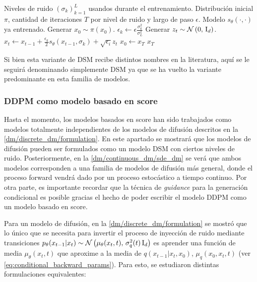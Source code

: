 \begin{algorithm}
    \caption{Annealed Langevin sampling}
    \label{alg:annealed_langevin}
    \begin{algorithmic}[1]
        \Require Niveles de ruido $(\sigma_k)_{k=1}^L$ usandos durante el entrenamiento.
        \Require Distribución inicial $\pi$, cantidad de iteraciones $T$ por nivel de ruido y largo de paso $\epsilon$.
        \Require Modelo $s_\theta(\cdot,\cdot)$ ya entrenado.
        \State Generar $x_0\sim \pi(x_0)$.
        \State $\epsilon_k \gets \epsilon \frac{\sigma_k^2}{\sigma_L^2}$  
        \State Generar $z_t\sim \mathcal{N}\left(0,\,\operatorname{I}_{d}\right)$.
        \State $x_t\gets x_{t-1} + \frac{\epsilon_k}{2}s_\theta(x_{t-1},\sigma_k) + \sqrt{\epsilon_i} z_t$
        \EndFor
        \State $x_0\gets x_T$
        \EndFor
        \State\Return $x_T$
    \end{algorithmic}
\end{algorithm}

Si bien esta variante de DSM recibe distintos nombres en la literatura, aquí se le seguirá denominando simplemente DSM ya que se ha vuelto la variante predominante en esta familia de modelos.

\subsubsection{DDPM como modelo basado en score}

Hasta el momento, los modelos basados en score han sido trabajados como modelos totalmente independientes de los modelos de difusión descritos en la \autoref{dm/discrete_dm/formulation}. En este apartado se mostrará que los modelos de difusión pueden ser formulados como un modelo DSM con ciertos niveles de ruido. Posteriormente, en la \autoref{dm/continuous_dm/sde_dm} se verá que ambos modelos corresponden a una familia de modelos de difusión más general, donde el proceso forward vendrá dado por un proceso estocástico a tiempo continuo. Por otra parte, es importante recordar que la técnica de \textit{guidance} para la generación condicional es posible gracias el hecho de poder escribir el modelo DDPM como un modelo basado en score.

Para un modelo de difusión, en la \autoref{dm/discrete_dm/formulation} se mostró que lo único que se necesita para invertir el proceso de inyección de ruido mediante transiciones $p_\theta(x_{t-1}|x_t)\sim\mathcal{N}\left(\mu_\theta(x_t,t),\,\sigma_q^2(t)\operatorname{I}_{d}\right)$ es aprender una función de media $\mu_\theta(x_t,t)$ que aproxime a la media de $q(x_{t-1}|x_t,x_0)$, $\mu_q(x_0,x_t,t)$ (ver \eqref{eq:conditional_backward_params}). Para esto, se estudiaron distintas formulaciones equivalentes:

